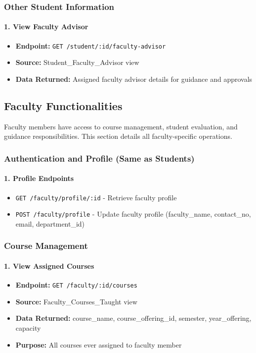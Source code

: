 \documentclass[12pt]{article}
\begin{document}
\subsubsection{Other Student Information}

\paragraph{1. View Faculty Advisor}
\begin{itemize}
    \item \textbf{Endpoint:} \texttt{GET /student/:id/faculty-advisor}
    \item \textbf{Source:} Student\_Faculty\_Advisor view
    \item \textbf{Data Returned:} Assigned faculty advisor details for guidance and approvals
\end{itemize}

\subsection{Faculty Functionalities}

Faculty members have access to course management, student evaluation, and guidance responsibilities. This section details all faculty-specific operations.

\subsubsection{Authentication and Profile (Same as Students)}

\paragraph{1. Profile Endpoints}
\begin{itemize}
    \item \texttt{GET /faculty/profile/:id} - Retrieve faculty profile
    \item \texttt{POST /faculty/profile} - Update faculty profile (faculty\_name, contact\_no, email, department\_id)
\end{itemize}

\subsubsection{Course Management}

\paragraph{1. View Assigned Courses}
\begin{itemize}
    \item \textbf{Endpoint:} \texttt{GET /faculty/:id/courses}
    \item \textbf{Source:} Faculty\_Courses\_Taught view
    \item \textbf{Data Returned:} course\_name, course\_offering\_id, semester, year\_offering, capacity
    \item \textbf{Purpose:} All courses ever assigned to faculty member
\end{itemize}
\end{document}

